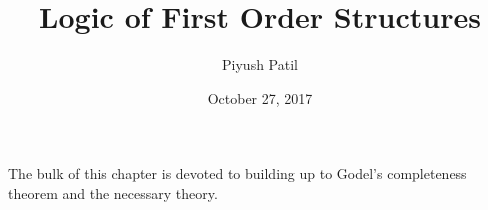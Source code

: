 \documentclass{article}
\begin{document}
\newcommand{\N}{\mathbb{N}}
\newcommand{\Z}{\mathbb{Z}}
\newcommand{\Q}{\mathbb{Q}}
\newcommand{\R}{\mathbb{R}}
\newcommand{\T}{\text{\normalfont\ T}}
\newcommand{\F}{\text{\normalfont\ F}}
\newcommand{\ti}{\textit}
\newcommand{\tb}{\textbf}
\newcommand{\n}{\leavevmode \newline}
\newcommand{\nn}{\leavevmode \newline \newline}
\def \Def#1#2{\begin{adjustwidth}{0.85cm}{0.85cm} \tb{(Definition) #1}: \ti{#2} \end{adjustwidth}}
\def \nDef#1#2{\n \Def{#1}{#2}}
\def \Defn#1#2{\Def{#1}{#2} \n}
\def \nDefn#1#2{\n \Defn{#1}{#2}}
\def \Defcont#1{\begin{adjustwidth}{0.85cm}{0.85cm} \ti{#1} \end{adjustwidth} \n}
\def \InDef#1{\ti{\begin{adjustwidth}{0.85cm}{0.85cm} #1 \end{adjustwidth}}}
\def \Thm#1#2{\begin{adjustwidth}{0.85cm}{0.85cm} \tb{(Theorem) #1}: \ti{#2} \end{adjustwidth}}
\def \nThm#1#2{\n \Thm{#1}{#2}}
\def \Thmn#1#2{\Thm{#1}{#2} \n}
\def \nThmn#1#2{\n \Thmn{#1}{#2}}
\def \InThm#1{\ti{\begin{adjustwidth}{0.85cm}{0.85cm} #1 \end{adjustwidth}}}
\def \Pf#1{\begin{adjustwidth}{0.85cm}{0.85cm} \textit{Proof}: #1 \qedsymbol \end{adjustwidth} \n}
\newcommand{\st}{\textnormal{ s.t. }}
\newcommand{\proplang}{\mathcal{L}_0}
\newcommand{\predlang}{\mathcal{L}}
\newcommand{\M}{\mathcal{M}}
\newcommand{\A}{\mathcal{A}}
\newcommand{\LA}{\predlang_\A}

\title{Logic of First Order Structures}
\author{Piyush Patil}
\date{October 27, 2017}
\maketitle

The bulk of this chapter is devoted to building up to Godel's completeness theorem and the necessary theory.
\end{document}
